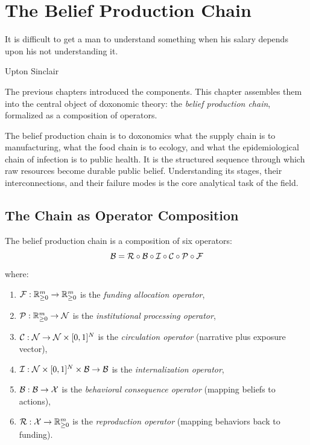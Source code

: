\chapter{The Belief Production Chain}
\label{ch:belief-production-chain}

\epigraph{It is difficult to get a man to understand something when his salary depends upon his not understanding it.}{Upton Sinclair}

\noindent
The previous chapters introduced the components.
This chapter assembles them into the central object of doxonomic theory: the \emph{belief production chain}, formalized as a composition of operators.

The belief production chain is to doxonomics what the supply chain is to manufacturing, what the food chain is to ecology, and what the epidemiological chain of infection is to public health.
It is the structured sequence through which raw resources become durable public belief.
Understanding its stages, their interconnections, and their failure modes is the core analytical task of the field.


\section{The Chain as Operator Composition}
\label{sec:ch5-composition}

\begin{definition}
\label{def:bpc-formal}
The belief production chain is a composition of six operators:
\[
  \mathcal{B} = \mathcal{R} \circ \mathcal{B} \circ \mathcal{I} \circ \mathcal{C} \circ \mathcal{P} \circ \mathcal{F}
\]
where:
\begin{enumerate}[nosep]
  \item $\mathcal{F}: \mathbb{R}^m_{\geq 0} \to \mathbb{R}^m_{\geq 0}$ is the \emph{funding allocation operator},
  \item $\mathcal{P}: \mathbb{R}^m_{\geq 0} \to \mathcal{N}$ is the \emph{institutional processing operator},
  \item $\mathcal{C}: \mathcal{N} \to \mathcal{N} \times [0,1]^N$ is the \emph{circulation operator} (narrative plus exposure vector),
  \item $\mathcal{I}: \mathcal{N} \times [0,1]^N \times \mathcal{B} \to \mathcal{B}$ is the \emph{internalization operator},
  \item $\mathcal{B}: \mathcal{B} \to \mathcal{X}$ is the \emph{behavioral consequence operator} (mapping beliefs to actions),
  \item $\mathcal{R}: \mathcal{X} \to \mathbb{R}^m_{\geq 0}$ is the \emph{reproduction operator} (mapping behaviors back to funding).
\end{enumerate}
\end{definition}

